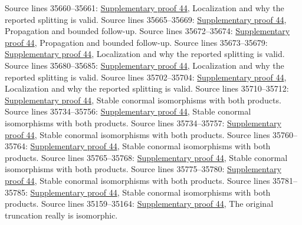 \begin{AlgebraSourceRoutes}
 Source lines 35660--35661: \hyperlink{algebra_naive_cotangent_notes_20260928}{Supplementary proof 44}, Localization and why the reported splitting is valid.
 Source lines 35665--35669: \hyperlink{algebra_naive_cotangent_notes_20260928}{Supplementary proof 44}, Propagation and bounded follow-up.
 Source lines 35672--35674: \hyperlink{algebra_naive_cotangent_notes_20260928}{Supplementary proof 44}, Propagation and bounded follow-up.
 Source lines 35673--35679: \hyperlink{algebra_naive_cotangent_notes_20260928}{Supplementary proof 44}, Localization and why the reported splitting is valid.
 Source lines 35680--35685: \hyperlink{algebra_naive_cotangent_notes_20260928}{Supplementary proof 44}, Localization and why the reported splitting is valid.
 Source lines 35702--35704: \hyperlink{algebra_naive_cotangent_notes_20260928}{Supplementary proof 44}, Localization and why the reported splitting is valid.
 Source lines 35710--35712: \hyperlink{algebra_naive_cotangent_notes_20260928}{Supplementary proof 44}, Stable conormal isomorphisms with both products.
 Source lines 35734--35756: \hyperlink{algebra_naive_cotangent_notes_20260928}{Supplementary proof 44}, Stable conormal isomorphisms with both products.
 Source lines 35734--35757: \hyperlink{algebra_naive_cotangent_notes_20260928}{Supplementary proof 44}, Stable conormal isomorphisms with both products.
 Source lines 35760--35764: \hyperlink{algebra_naive_cotangent_notes_20260928}{Supplementary proof 44}, Stable conormal isomorphisms with both products.
 Source lines 35765--35768: \hyperlink{algebra_naive_cotangent_notes_20260928}{Supplementary proof 44}, Stable conormal isomorphisms with both products.
 Source lines 35775--35780: \hyperlink{algebra_naive_cotangent_notes_20260928}{Supplementary proof 44}, Stable conormal isomorphisms with both products.
 Source lines 35781--35785: \hyperlink{algebra_naive_cotangent_notes_20260928}{Supplementary proof 44}, Stable conormal isomorphisms with both products.
 Source lines 35159--35164: \hyperlink{algebra_naive_cotangent_notes_20260928}{Supplementary proof 44}, The original truncation really is isomorphic.

\end{AlgebraSourceRoutes}
